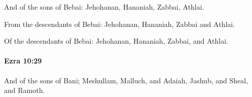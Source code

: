 			\begin{versebox}
					\item[BHS] 
					\item[LXX] 
					\item[ASV] And of the sons of Bebai: Jehohanan, Hananiah, Zabbai, Athlai.
					\item[NIV] From the descendants of Bebai: Jehohanan, Hananiah, Zabbai and Athlai.
					\item[NRSV] Of the descendants of Bebai: Jehohanan, Hananiah, Zabbai, and Athlai.
			\end{versebox}

		\paragraph{Ezra 10:29} %
			\label{EZRA-10-29}

			And of the sons of Bani; Meshullam, Malluch, and Adaiah, Jashub, and Sheal, and Ramoth.

